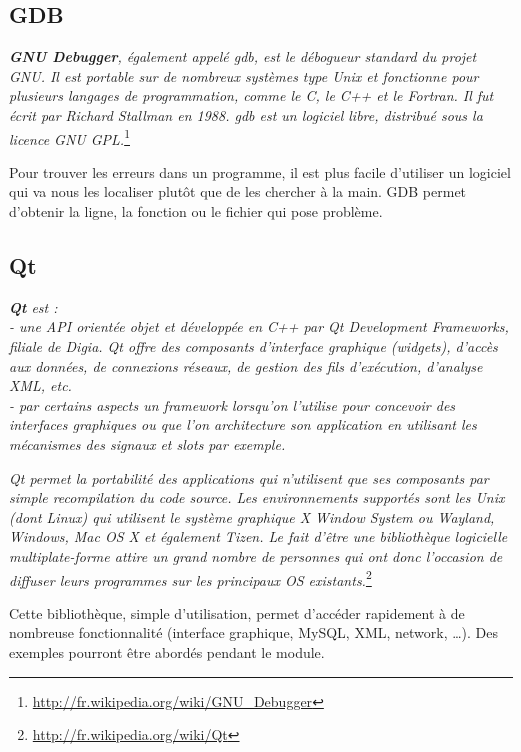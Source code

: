 \documentclass[a4paper,oneside]{article}
\begin{document}
\subsection{GDB}

   \textit{\textbf{GNU Debugger}, également appelé gdb, est le débogueur standard du projet GNU. Il est portable sur de nombreux systèmes type Unix et fonctionne pour plusieurs langages de programmation, comme le C, le C++ et le Fortran. Il fut écrit par Richard Stallman en 1988. gdb est un logiciel libre, distribué sous la licence GNU GPL.}\footnote{\url{http://fr.wikipedia.org/wiki/GNU_Debugger}}

  \vspace{5mm}
Pour trouver les erreurs dans un programme, il est plus facile d'utiliser un logiciel qui va nous les localiser plutôt que de les chercher à la main.
GDB permet d'obtenir la ligne, la fonction ou le fichier qui pose problème.

\newpage
\subsection{Qt}

   \textit{\textbf{Qt} est :\\
 - une API orientée objet et développée en C++ par Qt Development Frameworks, filiale de Digia. Qt offre des composants d'interface graphique (widgets), d'accès aux données, de connexions réseaux, de gestion des fils d'exécution, d'analyse XML, etc.\\
 - par certains aspects un framework lorsqu'on l'utilise pour concevoir des interfaces graphiques ou que l'on architecture son application en utilisant les mécanismes des signaux et slots par exemple.}
 
    \textit{Qt permet la portabilité des applications qui n'utilisent que ses composants par simple recompilation du code source. Les environnements supportés sont les Unix (dont Linux) qui utilisent le système graphique X Window System ou Wayland, Windows, Mac OS X et également Tizen. Le fait d'être une bibliothèque logicielle multiplate-forme attire un grand nombre de personnes qui ont donc l'occasion de diffuser leurs programmes sur les principaux OS existants.}\footnote{\url{http://fr.wikipedia.org/wiki/Qt}}

\vspace{5mm}
Cette bibliothèque, simple d'utilisation, permet d'accéder rapidement à de nombreuse fonctionnalité (interface graphique, MySQL, XML, network, \dots).
Des exemples pourront être abordés pendant le module.
\end{document}
